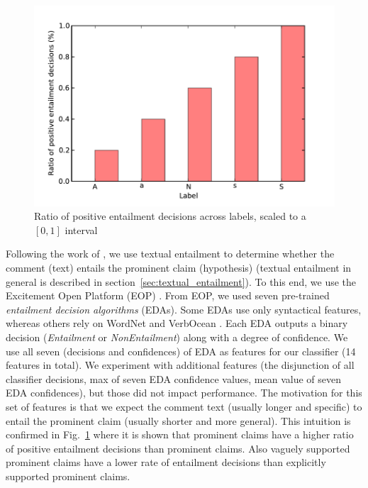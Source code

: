 \begin{figure}
\includegraphics{entailment.pdf}
\caption{Ratio of positive entailment decisions across labels, scaled to a $[0,1]$ interval
}
\label{fig:entailment_ratio}
\end{figure}

Following the work of \citet{cabrio2012combining}, we use textual 
entailment to determine whether the comment (text) entails the prominent
claim (hypothesis) (textual entailment in general is described in 
section~\ref{sec:textual_entailment}).
To this end, we use the Excitement Open Platform (EOP) \citep{pado2015design}. 
From EOP, we used seven pre-trained \textit{entailment decision algorithms}
(EDAs). 
Some EDAs use only syntactical features, whereas others rely on
WordNet \citep{miller1995wordnet} and VerbOcean \citep{chklovski2004verbocean}. 
Each EDA outputs a binary decision (\textit{Entailment} or \textit{NonEntailment})
along with a degree of confidence. 
We use all seven (decisions and confidences) of EDA as features for our classifier 
(14 features in total). 
We experiment with additional features (the disjunction of all classifier decisions, 
max of seven EDA confidence values, mean value of seven EDA confidences), but those
did not impact performance. 
The motivation for this set of features is that we expect the comment text
(usually longer and specific) to entail the prominent claim (usually shorter
and more general).
This intuition is confirmed in Fig.~\ref{fig:entailment_ratio}
where it is shown that 
 prominent claims have a higher ratio of positive entailment decisions than
 prominent claims.
Also vaguely supported prominent claims have a lower rate of entailment
decisions than explicitly supported prominent claims. 

